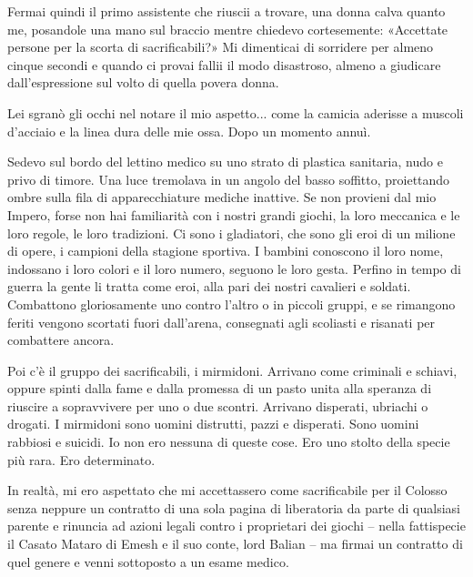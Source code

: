 Fermai quindi il primo assistente che riuscii a trovare, una donna calva
quanto me, posandole una mano sul braccio mentre chiedevo cortesemente:
«Accettate persone per la scorta di sacrificabili?» Mi dimenticai di
sorridere per almeno cinque secondi e quando ci provai fallii il modo
disastroso, almeno a giudicare dall'espressione sul volto di quella
povera donna.

Lei sgranò gli occhi nel notare il mio aspetto... come la camicia
aderisse a muscoli d'acciaio e la linea dura delle mie ossa. Dopo un
momento annuì.

\begin{figure}
	\centering
	\def\svgwidth{\columnwidth}
	\scalebox{0.2}{}
\end{figure}

Sedevo sul bordo del lettino medico su uno strato di plastica sanitaria,
nudo e privo di timore. Una luce tremolava in un angolo del basso
soffitto, proiettando ombre sulla fila di apparecchiature mediche
inattive. Se non provieni dal mio Impero, forse non hai familiarità con
i nostri grandi giochi, la loro meccanica e le loro regole, le loro
tradizioni. Ci sono i gladiatori, che sono gli eroi di un milione di
opere, i campioni della stagione sportiva. I bambini conoscono il loro
nome, indossano i loro colori e il loro numero, seguono le loro gesta.
Perfino in tempo di guerra la gente li tratta come eroi, alla pari dei
nostri cavalieri e soldati. Combattono gloriosamente uno contro l'altro
o in piccoli gruppi, e se rimangono feriti vengono scortati fuori
dall'arena, consegnati agli scoliasti e risanati per combattere ancora.

Poi c'è il gruppo dei sacrificabili, i mirmidoni. Arrivano come
criminali e schiavi, oppure spinti dalla fame e dalla promessa di un
pasto unita alla speranza di riuscire a sopravvivere per uno o due
scontri. Arrivano disperati, ubriachi o drogati. I mirmidoni sono uomini
distrutti, pazzi e disperati. Sono uomini rabbiosi e suicidi. Io non ero
nessuna di queste cose. Ero uno stolto della specie più rara. Ero
determinato.

In realtà, mi ero aspettato che mi accettassero come sacrificabile per
il Colosso senza neppure un contratto di una sola pagina di liberatoria
da parte di qualsiasi parente e rinuncia ad azioni legali contro i
proprietari dei giochi -- nella fattispecie il Casato Mataro di Emesh e
il suo conte, lord Balian -- ma firmai un contratto di quel genere e
venni sottoposto a un esame medico.


